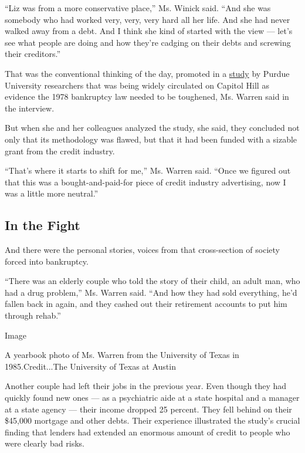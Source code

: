 ``Liz was from a more conservative place,'' Ms. Winick said. ``And she
was somebody who had worked very, very, very hard all her life. And she
had never walked away from a debt. And I think she kind of started with
the view --- let's see what people are doing and how they're cadging on
their debts and screwing their creditors.''

That was the conventional thinking of the day, promoted in a
\href{https://www.nytimes3xbfgragh.onion/1993/12/15/business/at-purdue-a-wealth-of-data-on-consumer-debt.html}{study}
by Purdue University researchers that was being widely circulated on
Capitol Hill as evidence the 1978 bankruptcy law needed to be toughened,
Ms. Warren said in the interview.

But when she and her colleagues analyzed the study, she said, they
concluded not only that its methodology was flawed, but that it had been
funded with a sizable grant from the credit industry.

``That's where it starts to shift for me,'' Ms. Warren said. ``Once we
figured out that this was a bought-and-paid-for piece of credit industry
advertising, now I was a little more neutral.''

\hypertarget{in-the-fight}{%
\subsection{In the Fight}\label{in-the-fight}}

And there were the personal stories, voices from that cross-section of
society forced into bankruptcy.

``There was an elderly couple who told the story of their child, an
adult man, who had a drug problem,'' Ms. Warren said. ``And how they had
sold everything, he'd fallen back in again, and they cashed out their
retirement accounts to put him through rehab.''

Image

A yearbook photo of Ms. Warren from the University of Texas in
1985.Credit...The University of Texas at Austin

Another couple had left their jobs in the previous year. Even though
they had quickly found new ones --- as a psychiatric aide at a state
hospital and a manager at a state agency --- their income dropped 25
percent. They fell behind on their \$45,000 mortgage and other debts.
Their experience illustrated the study's crucial finding that lenders
had extended an enormous amount of credit to people who were clearly bad
risks.

